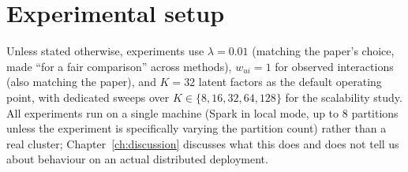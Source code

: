 \section{Experimental setup}

Unless stated otherwise, experiments use $\lambda=0.01$ (matching the
paper's choice, made ``for a fair comparison'' across methods),
$w_{ui}=1$ for observed interactions (also matching the paper), and
$K=32$ latent factors as the default operating point, with dedicated
sweeps over $K \in \{8,16,32,64,128\}$ for the scalability study. All
experiments run on a single machine (Spark in local mode, up to 8
partitions unless the experiment is specifically varying the partition
count) rather than a real cluster; Chapter~\ref{ch:discussion} discusses
what this does and does not tell us about behaviour on an actual
distributed deployment.
